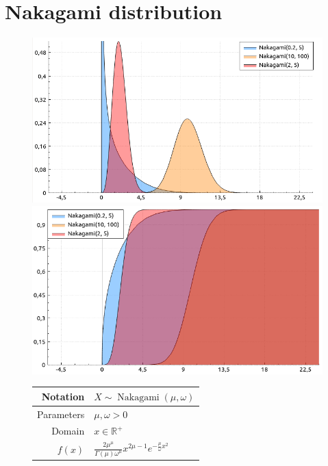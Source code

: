 \documentclass[a4paper,11pt]{article}
\theoremstyle{plain}
\theoremstyle{definition}
\newcommand{\MR}{\mathbb{R}}
\begin{document}
	\section{Nakagami distribution}
	\begin{figure}[!htb]\centering
		\begin{minipage}{0.55\textwidth}
			\includegraphics[width=\linewidth, right]{nakagami_pdf}
			\captionsetup{labelformat=empty}
			\includegraphics[width=\linewidth, right]{nakagami_cdf}
			\captionsetup{labelformat=empty}
		\end{minipage}
		\begin{minipage}{0.4\textwidth}
			\begin{tabular}{| r | l |}
				\hline
				Notation & $X \sim \operatorname{Nakagami}(\mu, \omega)$ \\
				\hline
				Parameters & $\mu, \omega > 0$ \\
				\hline
				Domain & $x \in \MR^+$  \\
				\hline
				$f(x)$ & $ \frac{2\mu^\mu}{\Gamma(\mu) \omega^\mu} x^{2\mu - 1} e^{-\frac{\mu}{\omega}x^2}   $ \\

\end{tabular}
\end{minipage}
\end{figure}
\end{document}
